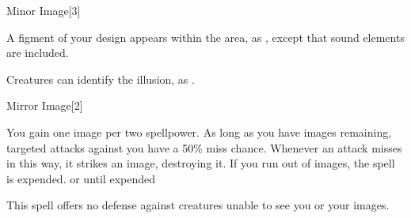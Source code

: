 \begin{spellsection}{Minor Image}[3]
    \begin{spellheader}
    \end{spellheader}
    \begin{spellcontent}
        \begin{spelltargetinginfo}
        \end{spelltargetinginfo}
        \begin{spelleffects}
            \spelleffect A figment of your design appears within the area, as , except that sound elements are included.
            \spelldur \durshort
        \end{spelleffects}
    \end{spellcontent}
    \begin{spellfooter}
        \spellnotes Creatures can identify the illusion, as .
        \miscastexplode
    \end{spellfooter}
\end{spellsection}

\begin{spellsection}{Mirror Image}[2]
    \begin{spellheader}
    \end{spellheader}
    \begin{spellcontent}
        \begin{spelltargetinginfo}
        \end{spelltargetinginfo}
        \begin{spelleffects}
            \spelleffect You gain one image per two spellpower. As long as you have images remaining, targeted attacks against you have a 50\% miss chance. Whenever an attack misses in this way, it strikes an image, destroying it. If you run out of images, the spell is expended.
            \spelldur \durshort or until expended \dismissable
        \end{spelleffects}
    \end{spellcontent}
    \begin{spellfooter}
        \spellnotes This spell offers no defense against creatures unable to see you or your images.
        \miscastexplode
    \end{spellfooter}
\end{spellsection}

